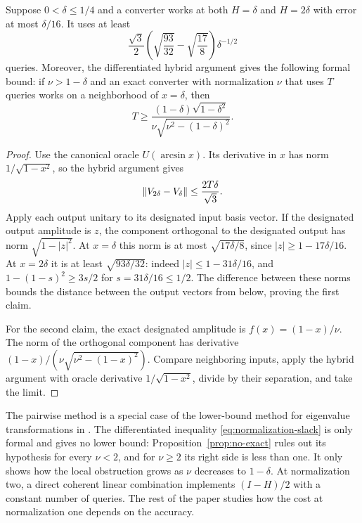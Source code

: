 \begin{proposition}\label{prop:pairwise}
Suppose $0<\delta\leq1/4$ and a converter works at both $H=\delta$ and $H=2\delta$ with error at most $\delta/16$. It uses at least
\[
 \frac{\sqrt3}{2}\left(\sqrt{\frac{93}{32}}-\sqrt{\frac{17}{8}}\right)\delta^{-1/2}
\]
queries. Moreover, the differentiated hybrid argument gives the following formal bound: if $\nu>1-\delta$ and an exact converter with normalization $\nu$ that uses $T$ queries works on a neighborhood of $x=\delta$, then
\begin{equation}\label{eq:normalization-slack}
 T\geq\frac{(1-\delta)\sqrt{1-\delta^2}}
 {\nu\sqrt{\nu^2-(1-\delta)^2}}.
\end{equation}
\end{proposition}
\begin{proof}
Use the canonical oracle $U(\arcsin x)$. Its derivative in $x$ has norm $1/\sqrt{1-x^2}$, so the hybrid argument gives
\[
 \left\lVert V_{2\delta}-V_\delta\right\rVert\leq\frac{2T\delta}{\sqrt3}.
\]
Apply each output unitary to its designated input basis vector. If the designated output amplitude is $z$, the component orthogonal to the designated output has norm $\sqrt{1-|z|^2}$. At $x=\delta$ this norm is at most $\sqrt{17\delta/8}$, since $|z|\geq1-17\delta/16$. At $x=2\delta$ it is at least $\sqrt{93\delta/32}$: indeed $|z|\leq1-31\delta/16$, and $1-(1-s)^2\geq3s/2$ for $s=31\delta/16\leq1/2$. The difference between these norms bounds the distance between the output vectors from below, proving the first claim.

For the second claim, the exact designated amplitude is $f(x)=(1-x)/\nu$. The norm of the orthogonal component has derivative $(1-x)/(\nu\sqrt{\nu^2-(1-x)^2})$. Compare neighboring inputs, apply the hybrid argument with oracle derivative $1/\sqrt{1-x^2}$, divide by their separation, and take the limit.
\end{proof}
The pairwise method is a special case of the lower-bound method for eigenvalue transformations in \cite[Theorem 73, extended version]{gilyen2019}. The differentiated inequality \eqref{eq:normalization-slack} is only formal and gives no lower bound: Proposition~\ref{prop:no-exact} rules out its hypothesis for every $\nu<2$, and for $\nu\geq2$ its right side is less than one. It only shows how the local obstruction grows as $\nu$ decreases to $1-\delta$. At normalization two, a direct coherent linear combination implements $(I-H)/2$ with a constant number of queries. The rest of the paper studies how the cost at normalization one depends on the accuracy.
